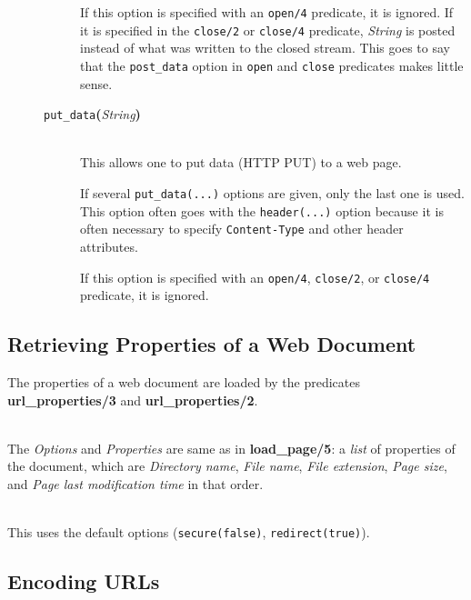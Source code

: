 \begin{description}
\begin{description}
    If this option is specified with an \texttt{open/4} predicate, it is
    ignored.  If it is specified in the \texttt{close/2} or 
    \texttt{close/4}   predicate, \emph{String} is posted instead of what was
    written to the closed stream. This goes to say that the \texttt{post\_data}
    option in \texttt{open} and \texttt{close} predicates makes little sense. 
    \item[{\tt put\_data}{\bf (}{\it String}{\bf )}]\mbox{}\\
    This allows one to put data (HTTP PUT) to a web page.

    If several \texttt{put\_data(...)} options are given, only the last one is
    used. This option often goes with the \texttt{header(...)} option because it
    is often necessary to specify \texttt{Content-Type} and other header
    attributes.  

    If this option is specified with an \texttt{open/4},
    \texttt{close/2}, or \texttt{close/4} predicate, it is
    ignored.
  \end{description}

\end{description}

\subsection{Retrieving Properties of a Web Document}

The properties of a web document are loaded by the predicates {\bf
  url\_properties/3} and {\bf url\_properties/2}. 

\begin{description}
\item[url\_properties({\it +Url, +Options, -Properties})]\mbox{}
  \\
  The {\it Options} and {\it Properties} are same as in {\bf load\_page/5}:
  a \emph{list} of properties of the document, which
  are {\it Directory name}, {\it File name}, {\it File extension}, {\it
    Page size}, and {\it Page last modification time} in that order.
\item[url\_properties({\it +Url, -Properties})]\mbox{}
  \\
  This uses the default options (\texttt{secure(false)}, \texttt{redirect(true)}). 

\end{description}

\subsection{Encoding URLs}

